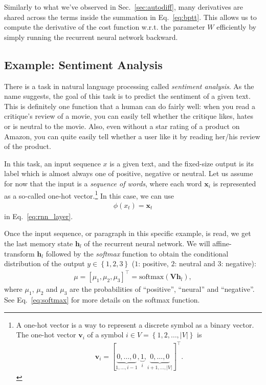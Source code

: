 \documentclass{report}
\newcommand{\softmax}{\text{softmax}}
\newcommand{\vect}[1]{\mathbf{#1}}
\newcommand{\matr}[1]{\mathbf{#1}}
\newcommand{\vh}[0]{\vect{h}}
\newcommand{\vv}[0]{\vect{v}}
\newcommand{\vx}[0]{\vect{x}}
\newcommand{\mV}[0]{\matr{V}}
\begin{document}
Similarly to what we've observed in Sec.~\ref{sec:autodiff}, many derivatives
are shared across the terms inside the summation in Eq.~\eqref{eq:bptt}. This
allows us to compute the derivative of the cost function w.r.t. the
parameter $W$ efficiently by simply running the recurrent neural network
backward. 

\subsection{Example: Sentiment Analysis}

There is a task in natural language processing called {\em sentiment analysis}.
As the name suggests, the goal of this task is to predict the sentiment of a
given text. This is definitely one function that a human can do fairly well:
when you read a critique's review of a movie, you can easily tell whether the
critique likes, hates or is neutral to the movie. Also, even without a star
rating of a product on Amazon, you can quite easily tell whether a user like it
by reading her/his review of the product.

In this task, an input sequence $x$ is a given text, and the fixed-size output
is its label which is almost always one of positive, negative or neutral. Let us
assume for now that the input is a {\em sequence of words}, where each word
$\vx_i$ is represented as a so-called one-hot vector.\footnote{
    A one-hot vector is a way to represent a discrete symbol as a binary vector.
    The one-hot vector $\vv_i$ of a symbol $i \in V = \left\{ 1, 2, \ldots, |V|
    \right\}$ is 
    \begin{align*}
        \vv_i = [ \underbrace{0, \ldots, 0}_{1,\ldots,i-1}, 
        \underbrace{1}_{i}, \underbrace{0, \ldots, 0}_{i+1, \ldots,
    |V|}]^\top.
    \end{align*}
} In this case, we can use 
\begin{align*}
    \phi(x_t) = \vx_t
\end{align*}
in Eq.~\eqref{eq:rnn_layer}.

Once the input sequence, or paragraph in this specific example, is read, we get
the last memory state $\vh_l$ of the recurrent neural network. We will
affine-transform $\vh_l$ followed by the {\em softmax} function to obtain the
conditional distribution of the output $y \in \left\{ 1, 2, 3 \right\}$ ($1$:
positive, $2$: neutral and $3$: negative):
\begin{align*}
    \mu = \left[ \mu_1, \mu_2, \mu_3 \right]^\top = \softmax(\mV \vh_l),
\end{align*}
where $\mu_1$, $\mu_2$ and $\mu_3$ are the probabilities of ``positive'',
``neural'' and ``negative''. See Eq.~\eqref{eq:softmax} for more details on the
softmax function.
\end{document}
